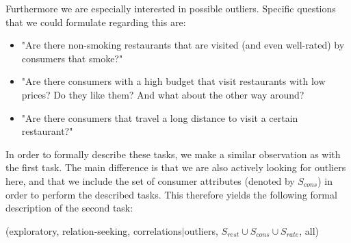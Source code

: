 Furthermore we are especially interested in possible outliers. Specific questions that we could formulate regarding this are:
\begin{itemize}
\setlength{\itemsep}{0cm}%
\setlength{\parskip}{0cm}%
\item "Are there non-smoking restaurants that are visited (and even well-rated) by consumers that smoke?"
\item "Are there consumers with a high budget that visit restaurants with low prices? Do they like them? And what about the other way around?
\item "Are there consumers that travel a long distance to visit a certain restaurant?"
\end{itemize}

In order to formally describe these tasks, we make a similar observation as with the first task. The main difference is that we are also actively looking for outliers here, and that we include the set of consumer attributes (denoted by $S_{cons}$) in order to perform the described tasks. This therefore yields the following formal description of the second task:

(exploratory, relation-seeking, correlations$|$outliers, $S_{rest} \cup S_{cons} \cup S_{rate}$, all)
